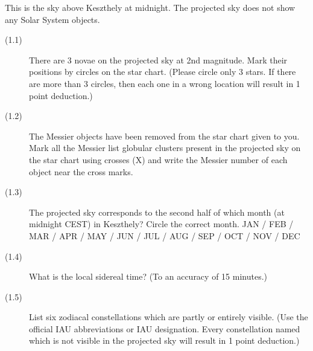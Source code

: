 This is the sky above Keszthely at midnight. The projected sky does not show
any Solar System objects.

\begin{description}
\item[(1.1)] There are 3 novae on the projected sky at 2nd magnitude. Mark
  their positions by circles on the star chart. (Please circle only 3 stars.
  If there are more than 3 circles, then each one in a wrong location will
  result in 1 point deduction.)
\item[(1.2)] The Messier objects have been removed from the star chart given
  to you. Mark all the Messier list globular clusters present in the
  projected sky on the star chart using crosses (X) and write the Messier
  number of each object near the cross marks.
\item[(1.3)] The projected sky corresponds to the second half of which month
  (at midnight CEST) in Keszthely? Circle the correct month.
  JAN / FEB / MAR / APR / MAY / JUN / JUL / AUG / SEP / OCT / NOV / DEC
\item[(1.4)] What is the local sidereal time? (To an accuracy of 15
  minutes.)
\item[(1.5)] List six zodiacal constellations which are partly or entirely
  visible. (Use the official IAU abbreviations or IAU designation. Every
  constellation named which is not visible in the projected sky will result
  in 1 point deduction.)
\end{description}

